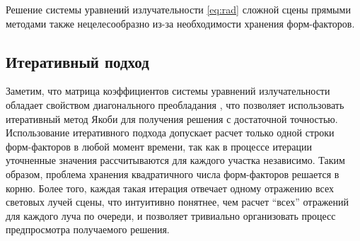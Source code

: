 \documentclass[12pt]{article}
\begin{document}
Решение системы уравнений излучательности \eqref{eq:rad} сложной сцены прямыми методами также нецелесообразно из-за необходимости хранения форм-факторов.
\subsection{Итеративный подход}
Заметим, что матрица коэффициентов системы уравнений излучательности обладает свойством диагонального преобладания \cite{Pet06}, что позволяет использовать итеративный метод Якоби для получения решения с достаточной точностью. Использование итеративного подхода допускает расчет только одной строки форм-факторов в любой момент времени, так как в процессе итерации уточненные значения рассчитываются для каждого участка независимо. Таким образом, проблема хранения квадратичного числа форм-факторов решается в корню. Более того, каждая такая итерация отвечает одному отражению всех световых лучей сцены, что интуитивно понятнее, чем расчет ``всех'' отражений для каждого луча по очереди, и позволяет тривиально организовать процесс предпросмотра получаемого решения.
\end{document}
